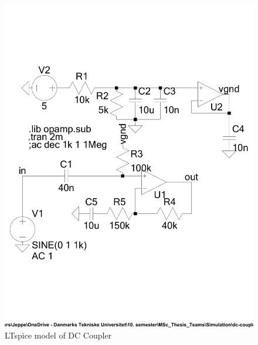 \begin{figure}[htbp]
	\centering
	\includegraphics[width=.9\textwidth]{Figures/appendix/ltspice_dccoupler.pdf}
	\caption{LTspice model of DC Coupler}
	\label{fig:app_ltspice_dc_coupler}
\end{figure}




